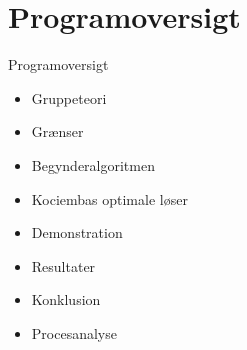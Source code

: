 \section*{Programoversigt}
\begin{frame}{Programoversigt}
\begin{itemize}
	\item Gruppeteori
	\item Gr\ae{}nser
	\item Begynderalgoritmen
	\item Kociembas optimale l\o{}ser
	\item Demonstration
	\item Resultater
	\item Konklusion
	\item Procesanalyse
\end{itemize}
\end{frame}